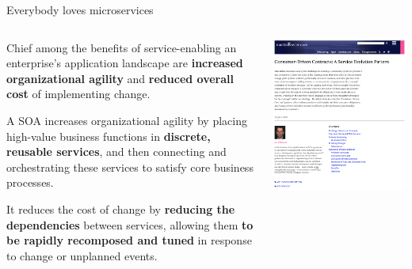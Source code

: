 \begin{frame}{Everybody loves microservices}
\begin{columns}
    \begin{column}{0.6\textwidth}
        \begin{shadequote}
            \small{
            \hspace{.5cm} Chief among the benefits of service-enabling an enterprise's
            application landscape are \textbf{increased organizational agility} and
            \textbf{reduced overall cost} of implementing change.

            \vspace{.3cm}

            A SOA increases organizational agility by placing high-value business functions
            in \textbf{discrete, reusable services}, and then connecting and orchestrating
            these services to satisfy core business processes.

            \vspace{.5cm}
            It reduces the cost of change by \textbf{reducing the dependencies} between services,
            allowing them \textbf{to be rapidly recomposed and tuned} in response to change or
            unplanned events.
            }
        \end{shadequote}
    \end{column}
    \begin{column}{0.4\textwidth}
        \includegraphics[width=1\textwidth]{./assets/ian_robinson}
    \end{column}
\end{columns}
\end{frame}


